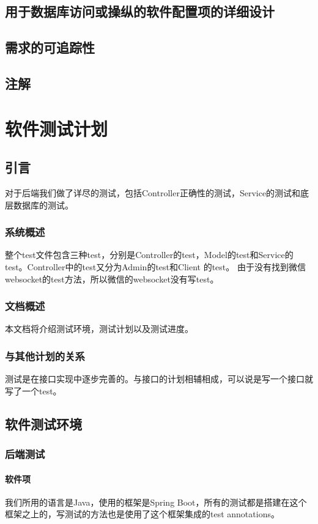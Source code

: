 \documentclass{article}
\begin{document}
\subsection{用于数据库访问或操纵的软件配置项的详细设计}

\subsection{需求的可追踪性}

\subsection{注解}

\section{软件测试计划}
\label{软件测试计划}
\subsection{引言}
对于后端我们做了详尽的测试，包括Controller正确性的测试，Service的测试和底层数据库的测试。
\subsubsection{系统概述}
整个test文件包含三种test，分别是Controller的test，Model的test和Service的test。Controller中的test又分为Admin的test和Client 的test。 由于没有找到微信websocket的test方法，所以微信的websocket没有写test。
\subsubsection{文档概述}
本文档将介绍测试环境，测试计划以及测试进度。
\subsubsection{与其他计划的关系}
测试是在接口实现中逐步完善的。与接口的计划相辅相成，可以说是写一个接口就写了一个test。
\subsection{软件测试环境}
\subsubsection{后端测试}
\paragraph{软件项}
	我们所用的语言是Java，使用的框架是Spring Boot，所有的测试都是搭建在这个框架之上的，写测试的方法也是使用了这个框架集成的test annotations。
\end{document}
